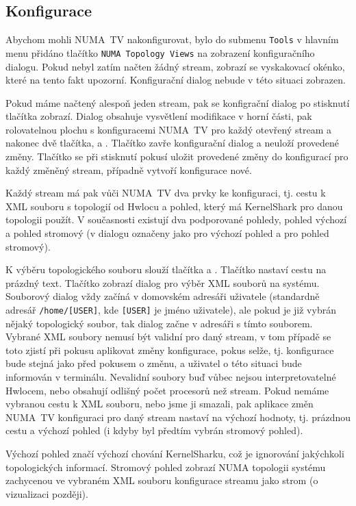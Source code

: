 \subsection{Konfigurace}

Abychom mohli NUMA~TV nakonfigurovat, bylo do submenu \texttt{Tools} v hlavním menu přidáno tlačítko \texttt{NUMA Topology Views} na zobrazení konfiguračního dialogu. Pokud nebyl zatím načten žádný stream, zobrazí se vyskakovací okénko, které na tento fakt upozorní. Konfigurační dialog nebude v této situaci zobrazen.

Pokud máme načtený alespoň jeden stream, pak se konfigrační dialog po stisknutí tlačítka zobrazí. Dialog obsahuje vysvětlení modifikace v horní části, pak rolovatelnou plochu s konfiguracemi NUMA~TV pro každý otevřený stream a nakonec dvě tlačítka,  a . Tlačítko  zavře konfigurační dialog a neuloží provedené změny. Tlačítko  se při stisknutí pokusí uložit provedené změny do konfigurací pro každý změněný stream, případně vytvoří konfigurace nové.

Každý stream má pak vůči NUMA~TV dva prvky ke konfiguraci, tj. cestu k XML souboru s topologií od Hwlocu a pohled, který má KernelShark pro danou topologii použít. V současnosti existují dva podporované pohledy, pohled výchozí a pohled stromový (v dialogu označeny jako  pro výchozí pohled a  pro pohled stromový).

K výběru topologického souboru slouží tlačítka  a . Tlačítko  nastaví cestu na prázdný text. Tlačítko  zobrazí dialog pro výběr XML souborů na systému. Souborový dialog vždy začíná v domovském adresáři uživatele (standardně adresář \texttt{/home/[USER]}, kde \texttt{[USER]} je jméno uživatele), ale pokud je již vybrán nějaký topologický soubor, tak dialog začne v adresáři s tímto souborem. Vybrané XML soubory nemusí být validní pro daný stream, v tom případě se toto zjistí při pokusu aplikovat změny konfigurace, pokus selže, tj. konfigurace bude stejná jako před pokusem o změnu, a uživatel o této situaci bude informován v terminálu. Nevalidní soubory buď vůbec nejsou interpretovatelné Hwlocem, nebo obsahují odlišný počet procesorů než stream. Pokud nemáme vybranou cestu k XML souboru, nebo jsme ji smazali, pak aplikace změn NUMA~TV konfiguraci pro daný stream nastaví na výchozí hodnoty, tj. prázdnou cestu a výchozí pohled (i kdyby byl předtím vybrán stromový pohled).

Výchozí pohled značí výchozí chování KernelSharku, což je ignorování jakýchkoli topologických informací. Stromový pohled zobrazí NUMA topologii systému zachycenou ve vybraném XML souboru konfigurace streamu jako strom (o vizualizaci později).

